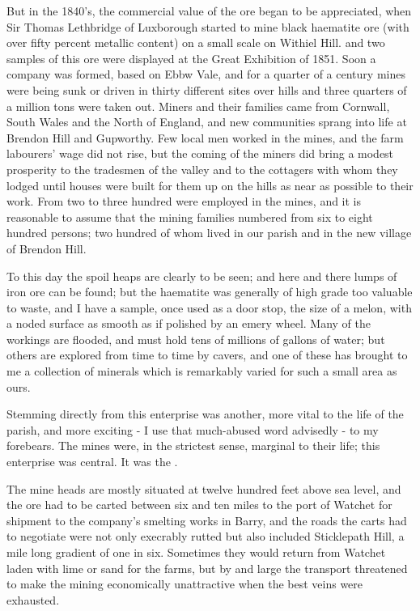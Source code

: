 But in the 1840’s, the commercial value of the ore began to be appreciated, when Sir Thomas Lethbridge of Luxborough started to mine black haematite ore (with over fifty percent metallic content) on a small scale on Withiel Hill. and two samples of this ore were displayed at the Great Exhibition of 1851. Soon a company was formed, based on Ebbw Vale, and for a quarter of a century mines were being sunk or driven in thirty different sites over hills and three quarters of a million tons were taken out. Miners and their families came from Cornwall, South Wales and the North of England, and new communities sprang into life at Brendon Hill and Gupworthy. Few local men worked in the mines, and the farm labourers’ wage did not rise, but the coming of the miners did bring a modest prosperity to the tradesmen of the valley and to the cottagers with whom they lodged until houses were built for them up on the hills as near as possible to their work. From two to three hundred were employed in the mines, and it is reasonable to assume that the mining families numbered from six to eight hundred persons; two hundred of whom lived in our parish and in the new village of Brendon Hill.

To this day the spoil heaps are clearly to be seen; and here and there lumps of iron ore can be found; but the haematite was generally of high grade too valuable to waste, and I have a sample, once used as a door stop, the size of a melon, with a noded surface as smooth as if polished by an emery wheel. Many of the workings are flooded, and must hold tens of millions of gallons of water; but others are explored from time to time by cavers, and one of these has brought to me a collection of minerals which is remarkably varied for such a small area as ours.

Stemming directly from this enterprise was another, more vital to the life of the parish, and more exciting - I use that much-abused word advisedly - to my forebears. The mines were, in the strictest sense, marginal to their life; this enterprise was central. It was the .

The mine heads are mostly situated at twelve hundred feet above sea level, and the ore had to be carted between six and ten miles to the port of Watchet for shipment to the company’s smelting works in Barry, and the roads the carts had to negotiate were not only execrably rutted but also included Sticklepath Hill, a mile long gradient of one in six. Sometimes they would return from Watchet laden with lime or sand for the farms, but by and large the transport threatened to make the mining economically unattractive when the best veins were exhausted.

